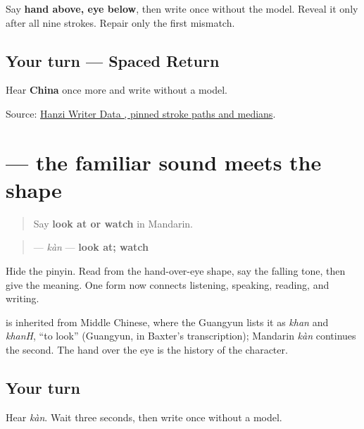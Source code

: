 Say \textbf{hand above, eye below}, then write \textbf{} once without the model. Reveal it only after all nine strokes. Repair only the first mismatch.

\subsection*{Your turn — Spaced Return}
Hear \textbf{China} once more and write  without a model.

\begin{tcolorbox}[breakable,colback=teal!4,colframe=teal!35!black,title={Before you move on}]
Source: \href{https://raw.githubusercontent.com/chanind/hanzi-writer-data/68d10a4b21150cae5e1ebbd223eed289cf32d90c/data/\%E7\%9C\%8B.json}{Hanzi Writer Data , pinned stroke paths and medians}.
\end{tcolorbox}
\section[\texorpdfstring{\zh{看} (kàn)}{看 (kàn)}]{ — the familiar sound meets the shape}

\label{lesson:ZH-C18-kan}



\begin{quote}
Say \textbf{look at or watch} in Mandarin.
\end{quote}

\begin{cousinweb}
\begin{quote}
\textbf{} — \emph{kàn} — \textbf{look at; watch}
\end{quote}

Hide the pinyin. Read  from the hand-over-eye shape, say the falling tone, then give the meaning. One form now connects listening, speaking, reading, and writing.

\textbf{} is inherited from Middle Chinese, where the Guangyun lists it as \emph{khan} and \emph{khanH}, \textquotedblleft{}to look\textquotedblright{} (Guangyun, in Baxter's transcription); Mandarin \emph{kàn} continues the second. The hand over the eye is the history of the character.
\end{cousinweb}

\subsection*{Your turn}
Hear \emph{kàn}. Wait three seconds, then write \textbf{} once without a model.

